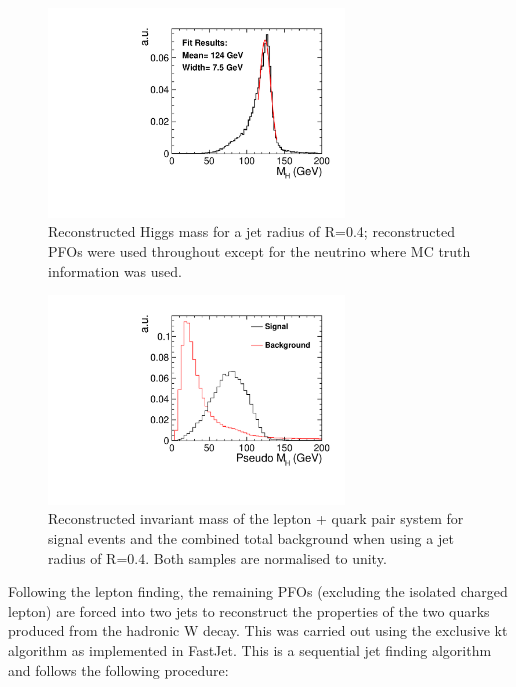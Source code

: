 \begin{figure}
  \centering
  \includegraphics[width=0.7\textwidth,keepaspectratio]{HiggsAnalysis/figures/CheatHiggs04}
  \caption[Reconstructed Higgs Mass For Optimum Jet Radius]{Reconstructed Higgs mass for a jet radius of R=0.4; reconstructed PFOs were used throughout except for the neutrino where MC truth information was used.}
  \label{fig:cheatHiggsMass}
\end{figure}

\begin{figure}
  \centering
  \includegraphics[width=0.7\textwidth,keepaspectratio]{HiggsAnalysis/figures/PseudoHiggs.pdf}
  \caption[Reconstructed Higgs Mass]{Reconstructed invariant mass of the lepton + quark pair system for signal events and the combined total background when using a jet radius of R=0.4. Both samples are normalised to unity.}
  \label{fig:pseudoHiggsMass}
\end{figure}


Following the lepton finding, the remaining PFOs (excluding the isolated charged lepton) are forced into two jets to reconstruct the properties of the two quarks produced from the hadronic W decay. This was carried out using the exclusive kt algorithm as implemented in FastJet. This is a sequential jet finding algorithm and follows the following procedure:

